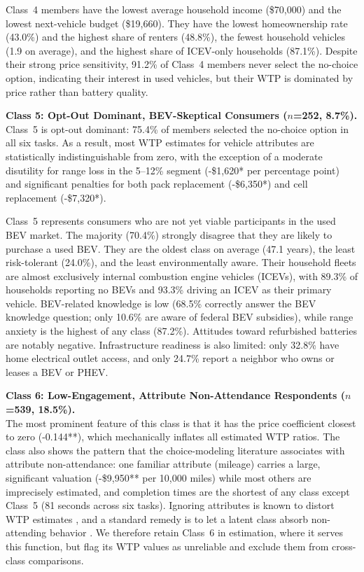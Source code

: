 \documentclass[a4paper,fleqn]{cas-sc}   %
\begin{document}
Class~4 members have the lowest average household income (\$70,000) and the lowest next-vehicle budget (\$19,660). They have the lowest homeownership rate (43.0\%) and the highest share of renters (48.8\%), the fewest household vehicles (1.9 on average), and the highest share of ICEV-only households (87.1\%). Despite their strong price sensitivity, 91.2\% of Class~4 members never select the no-choice option, indicating their interest in used vehicles, but their WTP is dominated by price rather than battery quality.

\medskip

\noindent\textbf{Class 5: Opt-Out Dominant, BEV-Skeptical Consumers ($n$=252, 8.7\%).}\\
Class~5 is opt-out dominant: 75.4\% of members selected the no-choice option in all six tasks. As a result, most WTP estimates for vehicle attributes are statistically indistinguishable from zero, with the exception of a moderate disutility for range loss in the 5--12\% segment (-\$1,620* per percentage point) and significant penalties for both pack replacement (-\$6,350*) and cell replacement (-\$7,320*).

Class~5 represents consumers who are not yet viable participants in the used BEV market. The majority (70.4\%) strongly disagree that they are likely to purchase a used BEV. They are the oldest class on average (47.1 years), the least risk-tolerant (24.0\%), and the least environmentally aware. Their household fleets are almost exclusively internal combustion engine vehicles (ICEVs), with 89.3\% of households reporting no BEVs and 93.3\% driving an ICEV as their primary vehicle. BEV-related knowledge is low (68.5\% correctly answer the BEV knowledge question; only 10.6\% are aware of federal BEV subsidies), while range anxiety is the highest of any class (87.2\%). Attitudes toward refurbished batteries are notably negative. Infrastructure readiness is also limited: only 32.8\% have home electrical outlet access, and only 24.7\% report a neighbor who owns or leases a BEV or PHEV.

\medskip

\noindent\textbf{Class 6: Low-Engagement, Attribute Non-Attendance Respondents ($n$=539, 18.5\%).}\\
The most prominent feature of this class is that it has the price coefficient closest to zero (-0.144**), which mechanically inflates all estimated WTP ratios. The class also shows the pattern that the choice-modeling literature associates with attribute non-attendance: one familiar attribute (mileage) carries a large, significant valuation (-\$9,950** per 10,000 miles) while most others are imprecisely estimated, and completion times are the shortest of any class except Class~5 (81 seconds across six tasks). Ignoring attributes is known to distort WTP estimates \parencite{hensherImplicationsWillingnessPay2005}, and a standard remedy is to let a latent class absorb non-attending behavior \parencite{scarpaModellingAttributeNonattendance2009}. We therefore retain Class~6 in estimation, where it serves this function, but flag its WTP values as unreliable and exclude them from cross-class comparisons.
\end{document}
